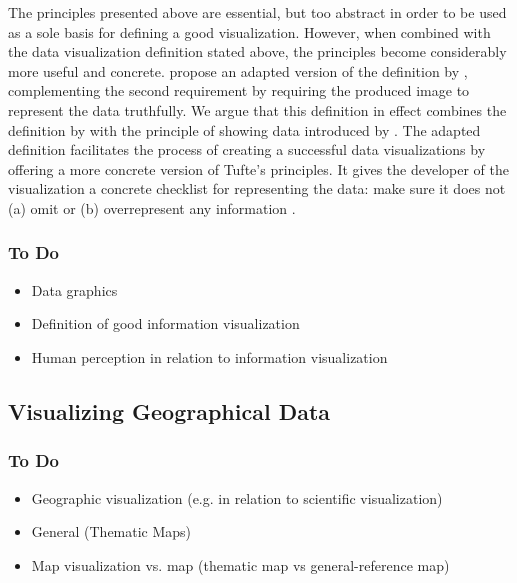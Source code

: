 The principles presented above are essential, but too abstract in order to be used as a sole basis for defining a good visualization. However, when combined with the data visualization definition stated above, the principles become considerably more useful and concrete. \citet{azzam_j-b_2013} propose an adapted version of the definition by \citet{kosara_visualization_2007}, complementing the second requirement by requiring the produced image to represent the data truthfully. We argue that this definition in effect combines the definition by \citet{kosara_visualization_2007} with the principle of showing data introduced by \citet{tufte_visual_1986}. The adapted definition facilitates the process of creating a successful data visualizations by offering a more concrete version of Tufte's principles. It gives the developer of the visualization a concrete checklist for representing the data: make sure it does not (a) omit or (b)  overrepresent any information \citep{azzam_j-b_2013}.



\subsubsection{To Do}
\begin{itemize}
	\item Data graphics
	\item Definition of good information visualization
	\item Human perception in relation to information visualization
\end{itemize}

\subsection{Visualizing Geographical Data}

\subsubsection{To Do}
\begin{itemize}
	\item Geographic visualization (e.g. in relation to scientific visualization)
	\item General (Thematic Maps)
	\item Map visualization vs. map (thematic map vs general-reference map)
\end{itemize}

